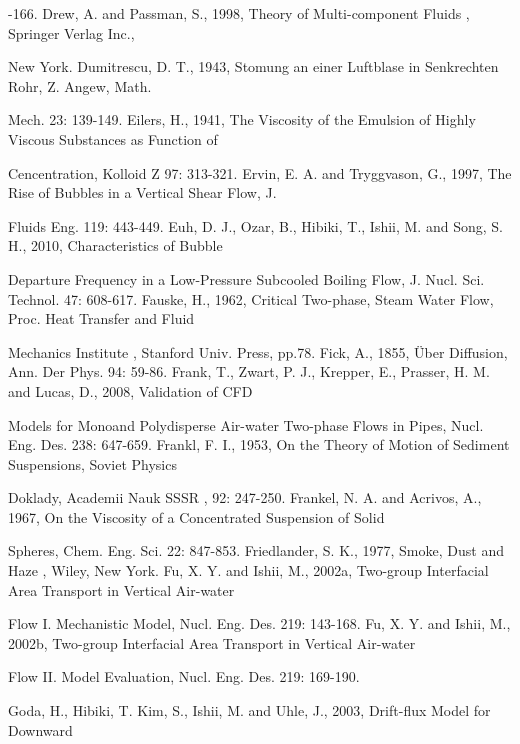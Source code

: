 \documentclass[11pt,a4paper,openany,fontset=none]{ctexbook}
\begin{document}
{\small\raggedright{}-166. Drew, A. and Passman, S., 1998, Theory of Multi-component Fluids , Springer Verlag Inc.,\par}
{\small\raggedright\noindent New York. Dumitrescu, D. T., 1943, Stomung an einer Luftblase in Senkrechten Rohr, Z. Angew, Math.\par}
{\small\raggedright\noindent Mech. 23: 139-149. Eilers, H., 1941, The Viscosity of the Emulsion of Highly Viscous Substances as Function of\par}
{\small\raggedright\noindent Cencentration, Kolloid Z 97: 313-321. Ervin, E. A. and Tryggvason, G., 1997, The Rise of Bubbles in a Vertical Shear Flow, J.\par}
{\small\raggedright\noindent Fluids Eng. 119: 443-449. Euh, D. J., Ozar, B., Hibiki, T., Ishii, M. and Song, S. H., 2010, Characteristics of Bubble\par}
{\small\raggedright\noindent Departure Frequency in a Low-Pressure Subcooled Boiling Flow, J. Nucl. Sci. Technol. 47: 608-617. Fauske, H., 1962, Critical Two-phase, Steam Water Flow, Proc. Heat Transfer and Fluid\par}
{\small\raggedright\noindent Mechanics Institute , Stanford Univ. Press, pp.78. Fick, A., 1855, Über Diffusion, Ann. Der Phys. 94: 59-86. Frank, T., Zwart, P. J., Krepper, E., Prasser, H. M. and Lucas, D., 2008, Validation of CFD\par}
{\small\raggedright\noindent Models for Monoand Polydisperse Air-water Two-phase Flows in Pipes, Nucl. Eng. Des. 238: 647-659. Frankl, F. I., 1953, On the Theory of Motion of Sediment Suspensions, Soviet Physics\par}
{\small\raggedright\noindent Doklady, Academii Nauk SSSR , 92: 247-250. Frankel, N. A. and Acrivos, A., 1967, On the Viscosity of a Concentrated Suspension of Solid\par}
{\small\raggedright\noindent Spheres, Chem. Eng. Sci. 22: 847-853. Friedlander, S. K., 1977, Smoke, Dust and Haze , Wiley, New York. Fu, X. Y. and Ishii, M., 2002a, Two-group Interfacial Area Transport in Vertical Air-water\par}
{\small\raggedright\noindent Flow I. Mechanistic Model, Nucl. Eng. Des. 219: 143-168. Fu, X. Y. and Ishii, M., 2002b, Two-group Interfacial Area Transport in Vertical Air-water\par}
{\small\raggedright\noindent Flow II. Model Evaluation, Nucl. Eng. Des. 219: 169-190.\par}
{\small\raggedright\noindent Goda, H., Hibiki, T. Kim, S., Ishii, M. and Uhle, J., 2003, Drift-flux Model for Downward\par}
\end{document}
